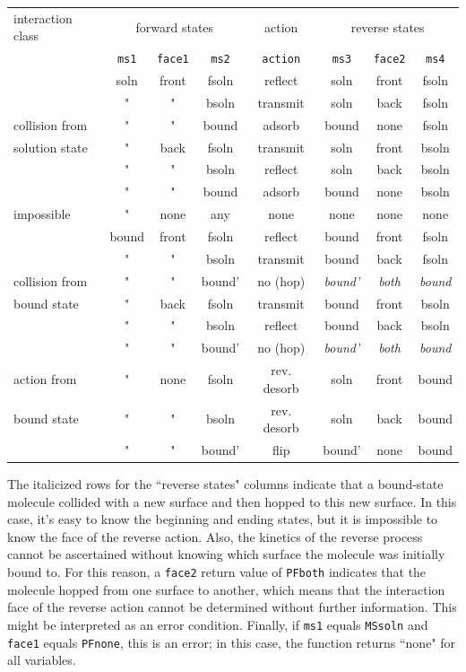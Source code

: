 \documentclass {scrbook}
\newcommand {\ttt} {\texttt}
\begin{document}
\begin{description}
\begin{longtable}[c]{l|ccc|c|ccc}
interaction class&\multicolumn{3}{c}{forward states}&action&\multicolumn{3}{c}{reverse states}\\
&\ttt{ms1}&\ttt{face1}&\ttt{ms2}&\ttt{action}&\ttt{ms3}&\ttt{face2}&\ttt{ms4}\\
\hline
&soln&front&fsoln&reflect&soln&front&fsoln\\
&"&"&bsoln&transmit&soln&back&fsoln\\
collision from&"&"&bound&adsorb&bound&none&fsoln\\
solution state&"&back&fsoln&transmit&soln&front&bsoln\\
&"&"&bsoln&reflect&soln&back&bsoln\\
&"&"&bound&adsorb&bound&none&bsoln\\
\hline
impossible&"&none&any&none&none&none&none\\
\hline
&bound&front&fsoln&reflect&bound&front&fsoln\\
&"&"&bsoln&transmit&bound&back&fsoln\\
collision from&"&"&bound'&no (hop)&\emph{bound'}&\emph{both}&\emph{bound}\\
bound state&"&back&fsoln&transmit&bound&front&bsoln\\
&"&"&bsoln&reflect&bound&back&bsoln\\
&"&"&bound'&no (hop)&\emph{bound'}&\emph{both}&\emph{bound}\\
\hline
action from&"&none&fsoln&rev. desorb&soln&front&bound\\
bound state&"&"&bsoln&rev. desorb&soln&back&bound\\
&"&"&bound'&flip&bound'&none&bound\\
\end{longtable}

The italicized rows for the ``reverse states" columns indicate that a bound-state molecule collided with a new surface and then hopped to this new surface. In this case, it's easy to know the beginning and ending states, but it is impossible to know the face of the reverse action. Also, the kinetics of the reverse process cannot be ascertained without knowing which surface the molecule was initially bound to. For this reason, a \ttt{face2} return value of \ttt{PFboth} indicates that the molecule hopped from one surface to another, which means that the interaction face of the reverse action cannot be determined without further information. This might be interpreted as an error condition. Finally, if \ttt{ms1} equals \ttt{MSsoln} and \ttt{face1} equals \ttt{PFnone}, this is an error; in this case, the function returns ``none" for all variables.


\end{description}
\end{document}
